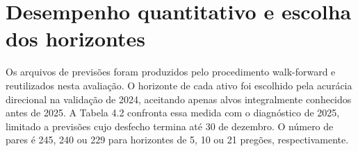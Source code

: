 
\clearpage
\section{Desempenho quantitativo e escolha dos horizontes}
Os arquivos de previsões foram produzidos pelo procedimento walk-forward e reutilizados nesta avaliação. O horizonte de cada ativo foi escolhido pela acurácia direcional na validação de 2024, aceitando apenas alvos integralmente conhecidos antes de 2025. A Tabela 4.2 confronta essa medida com o diagnóstico de 2025, limitado a previsões cujo desfecho termina até 30 de dezembro. O número de pares é 245, 240 ou 229 para horizontes de 5, 10 ou 21 pregões, respectivamente.

